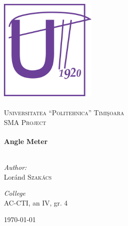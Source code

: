 \begin{titlepage}

\begin{center}

\includegraphics[height=5cm]{images/logo_upt.jpg}\\
\textsc{\LARGE \\Universitatea ``Politehnica'' Timi\c{s}oara}\\[1.5cm]

\textsc{\Large SMA Project}\\[0.5cm]


\HRule \\[0.4cm]
{ \huge \bfseries Angle Meter}\\[0.4cm]
\HRule \\[1.5cm]

\begin{minipage}{0.4\textwidth}
\begin{flushleft} \large
\emph{Author:}\\
Lor\'{a}nd \textsc{Szak\'{a}cs}
\end{flushleft}
\end{minipage}
\begin{minipage}{0.4\textwidth}
\begin{flushright} \large
\emph{College}\\
AC-CTI, an IV, gr. 4\\
\end{flushright}
\end{minipage}

\vfill
{\large \today}

\end{center}

\end{titlepage}